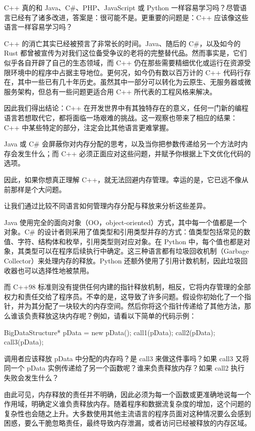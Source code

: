 C++ 真的和 Java、C\#、PHP、JavaScript 或 Python 一样容易学习吗？尽管语言已经有了诸多改进，答案是：很可能不是。更重要的问题是：C++ 应该像这些语言一样容易学习吗？

C++ 的消亡其实已经被预言了非常长的时间。Java、随后的 C\#，以及如今的 Rust 都曾被宣传为对我们这位备受争议的老将的完整替代品。然而事实是，它们似乎各自开辟了自己的生态领域，而 C++ 仍在那些需要精细优化或运行在资源受限环境中的程序中占据主导地位。更何况，如今仍有数以百万计的 C++ 代码行存在，其中一些已有几十年历史。虽然其中一部分可以转化为云原生、无服务器或微服务架构，但总有一些问题更适合用 C++ 所代表的工程风格来解决。

因此我们得出结论：C++ 在开发世界中有其独特存在的意义，任何一门新的编程语言若想取代它，都将面临一场艰难的挑战。这一观察也带来了相应的结果：C++ 中某些特定的部分，注定会比其他语言更难掌握。

Java 或 C\# 会屏蔽你对内存分配的思考，以及当你把参数传递给另一个方法时内存会发生什么；而 C++ 必须正面应对这些问题，并赋予你根据上下文优化代码的选项。

因此，如果你想真正理解 C++，就无法回避内存管理。幸运的是，它已远不像从前那样是个大问题。

让我们通过比较不同语言如何管理内存分配与释放来分析这些差异。

Java 使用完全的面向对象（OO，object-oriented）方式，其中每一个值都是一个对象。C\# 的设计者则采用了值类型和引用类型并存的方式：值类型包括常见的数值、字符、结构体和枚举，引用类型则对应对象。在 Python 中，每个值也都是对象，其类型可以在程序后续执行中确定。这三种语言都有垃圾回收机制（Garbage Collector）来处理内存的释放。Python 还额外使用了引用计数机制，因此垃圾回收器也可以选择性地被禁用。

而 C++98 标准则没有提供任何内建的指针释放机制，相反，它将内存管理的全部权力和责任交给了程序员。不幸的是，这导致了许多问题。假设你初始化了一个指针，并为其分配了一块较大的内存空间。然后你将这个指针传递给了其他方法，那么谁该负责释放这块内存呢？例如，请看以下简单的代码示例：

\begin{cpp}
BigDataStructure* pData = new pData();
call1(pData);
call2(pData);
call3(pData);
\end{cpp}

调用者应该释放 pData 中分配的内存吗？是 call3 来做这件事吗？如果 call3 又将同一个 pData 实例传递给了另一个函数呢？谁来负责释放内存？如果 call2 执行失败会发生什么？

由此可见，内存释放的责任并不明确，因此必须为每一个函数或更准确地说每一个作用域，明确定义谁负责释放内存。随着程序和数据流复杂度的增加，这个问题的复杂性也会随之上升。大多数使用其他主流语言的程序员面对这种情况要么会感到困惑，要么干脆忽略责任，最终导致内存泄漏，或者访问已经被释放的内存区域。

